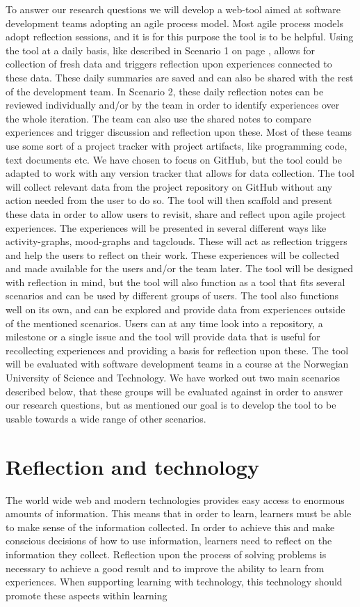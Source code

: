 To answer our research questions we will develop a web-tool aimed at software development teams adopting an agile process model. Most agile process models adopt reflection sessions, and it is for this purpose the tool is to be helpful. Using the tool at a daily basis, like described in Scenario 1 on page \pageref{scenario1}, allows for collection of fresh data and triggers reflection upon experiences connected to these data. These daily summaries are saved and can also be shared with the rest of the development team. In Scenario 2, these daily reflection notes can be reviewed individually and/or by the team in order to identify experiences over the whole iteration. The team can also use the shared notes to compare experiences and trigger discussion and reflection upon these. 
Most of these teams use some sort of a project tracker with project artifacts, like programming code, text documents etc. We have chosen to focus on GitHub, but the tool could be adapted to work with any version tracker that allows for data collection. The tool will collect relevant data from the project repository on GitHub without any action needed from the user to do so. The tool will then scaffold and present these data in order to allow users to revisit, share and reflect upon agile project experiences.
The experiences will be presented in several different ways like activity-graphs, mood-graphs and tagclouds. These will act as reflection triggers and help the users to reflect on their work. These experiences will be collected and made available for the users and/or the team later. The tool will be designed with reflection in mind, but the tool will also function as 
a tool that fits several scenarios and can be used by different groups of users. The tool also functions well on its own, and can be explored and provide data from experiences outside of the mentioned scenarios. Users can at any time look into a repository, a milestone or a single issue and the tool will provide data that is useful for recollecting experiences and providing a basis for reflection upon these. 
The tool will be evaluated with software development teams in a course at the Norwegian University of Science and Technology. We have worked out two main scenarios described below, that these groups will be evaluated against in order to answer our research questions, but as mentioned our goal is to develop the tool to be usable towards a wide range of other scenarios. 

\section{Reflection and technology}
The world wide web and modern technologies provides easy access to enormous amounts of information. This means that in order to learn, learners must be able to make sense of the information collected.  
In order to achieve this and make conscious decisions of how to use information, learners need to reflect on the information they collect. Reflection upon the process of solving problems is necessary to achieve a good result and to improve the ability to learn from experiences. When supporting learning with technology, this technology should promote these aspects within learning\cite{Lin1999}

